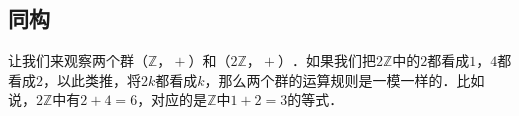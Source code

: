 

\subsection{同构}

让我们来观察两个群$（\mathbb{Z}， +）$和$（2\mathbb{Z}，+）$．如果我们把$2\mathbb{Z}$中的$2$都看成$1$，$4$都看成$2$，以此类推，将$2k$都看成$k$，那么两个群的运算规则是一模一样的．比如说，$2\mathbb{Z}$中有$2+4=6$，对应的是$\mathbb{Z}$中$1+2=3$的等式．